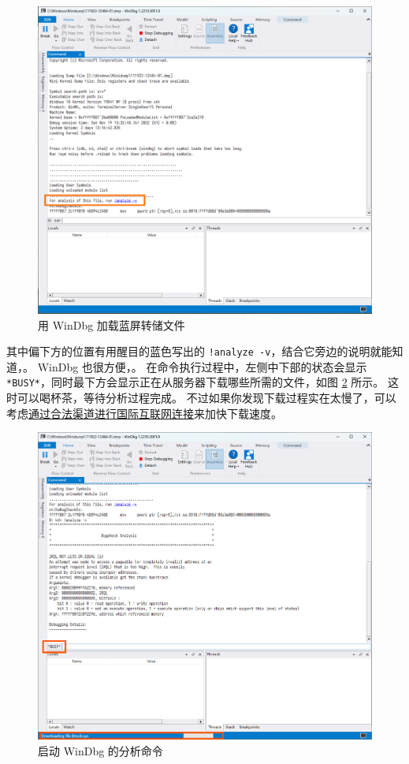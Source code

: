 \begin{figure}[htb!]
  \centering
  \includegraphics[width=12cm]{assets/WinDbg-1.png}
  \caption{用 WinDbg 加载蓝屏转储文件}
  \label{WinDbg-1}
\end{figure}

其中偏下方的位置有用醒目的蓝色写出的 \verb|!analyze -v|，结合它旁边的说明就能知道，。
WinDbg 也很方便，。
在命令执行过程中，左侧中下部的状态会显示 \verb|*BUSY*|，同时最下方会显示正在从服务器下载哪些所需的文件，如图 \ref{WinDbg-2} 所示。
这时可以喝杯茶，等待分析过程完成。
不过如果你发现下载过程实在太慢了，可以考虑\href{http://www.gov.cn/zhengce/2020-12/26/content_5574802.htm}{通过合法渠道进行国际互联网连接}来加快下载速度。

\begin{figure}[htb!]
  \centering
  \includegraphics[width=13cm]{assets/WinDbg-2.png}
  \caption{启动 WinDbg 的分析命令}
  \label{WinDbg-2}
\end{figure}


